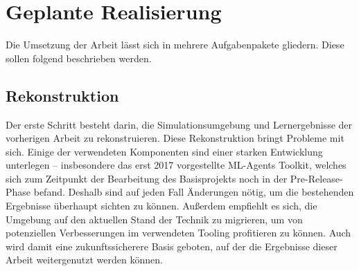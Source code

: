 
\section{Geplante Realisierung}
Die Umsetzung der Arbeit lässt sich in mehrere Aufgabenpakete gliedern.
Diese sollen folgend beschrieben werden.

\subsection{Rekonstruktion}
Der erste Schritt besteht darin, die Simulationsumgebung und Lernergebnisse der vorherigen Arbeit zu rekonstruieren.
Diese Rekonstruktion bringt Probleme mit sich.
Einige der verwendeten Komponenten sind einer starken Entwicklung unterlegen -- insbesondere das erst 2017 vorgestellte ML-Agents Toolkit, welches sich zum Zeitpunkt der Bearbeitung des Basisprojekts noch in der Pre-Release-Phase befand. \cite{mlagentsHistory}
Deshalb sind auf jeden Fall Änderungen nötig, um die bestehenden Ergebnisse überhaupt sichten zu können.
Außerdem empfiehlt es sich, die Umgebung auf den aktuellen Stand der Technik zu migrieren, um von potenziellen Verbesserungen im verwendeten Tooling profitieren zu können.
Auch wird damit eine zukunftssicherere Basis geboten, auf der die Ergebnisse dieser Arbeit weitergenutzt werden können.

